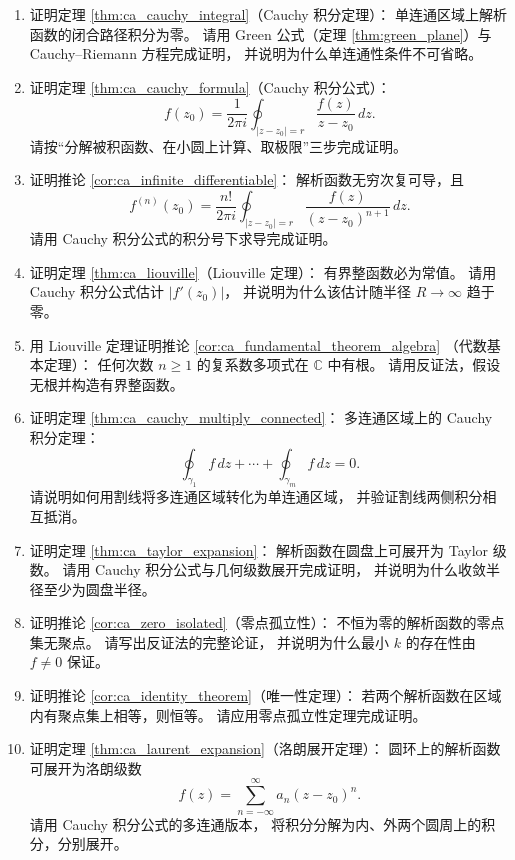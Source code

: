 \begin{enumerate}[leftmargin=3em, label=\textbf{题 \arabic*}]
    \item 证明定理 \ref{thm:ca_cauchy_integral}（Cauchy 积分定理）：
    单连通区域上解析函数的闭合路径积分为零。
    请用 Green 公式（定理 \ref{thm:green_plane}）与
    Cauchy--Riemann 方程完成证明，
    并说明为什么单连通性条件不可省略。

    \item 证明定理 \ref{thm:ca_cauchy_formula}（Cauchy 积分公式）：
    \[
    f(z_0)=\frac{1}{2\pi i}\oint_{|z-z_0|=r}
    \frac{f(z)}{z-z_0}\,dz.
    \]
    请按“分解被积函数、在小圆上计算、取极限”三步完成证明。

    \item 证明推论 \ref{cor:ca_infinite_differentiable}：
    解析函数无穷次复可导，且
    \[
    f^{(n)}(z_0)=\frac{n!}{2\pi i}\oint_{|z-z_0|=r}
    \frac{f(z)}{(z-z_0)^{n+1}}\,dz.
    \]
    请用 Cauchy 积分公式的积分号下求导完成证明。

    \item 证明定理 \ref{thm:ca_liouville}（Liouville 定理）：
    有界整函数必为常值。
    请用 Cauchy 积分公式估计 $|f'(z_0)|$，
    并说明为什么该估计随半径 $R\to\infty$ 趋于零。

    \item 用 Liouville 定理证明推论 \ref{cor:ca_fundamental_theorem_algebra}
    （代数基本定理）：
    任何次数 $n\ge 1$ 的复系数多项式在 $\mathbb{C}$ 中有根。
    请用反证法，假设无根并构造有界整函数。

    \item 证明定理 \ref{thm:ca_cauchy_multiply_connected}：
    多连通区域上的 Cauchy 积分定理：
    \[
    \oint_{\gamma_1}f\,dz+\cdots+\oint_{\gamma_m}f\,dz=0.
    \]
    请说明如何用割线将多连通区域转化为单连通区域，
    并验证割线两侧积分相互抵消。

    \item 证明定理 \ref{thm:ca_taylor_expansion}：
    解析函数在圆盘上可展开为 Taylor 级数。
    请用 Cauchy 积分公式与几何级数展开完成证明，
    并说明为什么收敛半径至少为圆盘半径。

    \item 证明推论 \ref{cor:ca_zero_isolated}（零点孤立性）：
    不恒为零的解析函数的零点集无聚点。
    请写出反证法的完整论证，
    并说明为什么最小 $k$ 的存在性由 $f\neq 0$ 保证。

    \item 证明推论 \ref{cor:ca_identity_theorem}（唯一性定理）：
    若两个解析函数在区域内有聚点集上相等，则恒等。
    请应用零点孤立性定理完成证明。

    \item 证明定理 \ref{thm:ca_laurent_expansion}（洛朗展开定理）：
    圆环上的解析函数可展开为洛朗级数
    \[
    f(z)=\sum_{n=-\infty}^{\infty}a_n(z-z_0)^n.
    \]
    请用 Cauchy 积分公式的多连通版本，
    将积分分解为内、外两个圆周上的积分，分别展开。


\end{enumerate}
